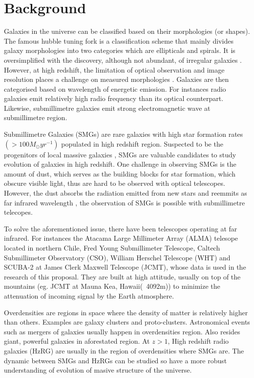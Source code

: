 \documentclass{article}
\begin{document}
\section{Background}
Galaxies in the universe can be classified based on their morphologies (or shapes). The famous hubble tuning fork is a classification scheme that mainly divides galaxy morphologies into two categories which are ellipticals and spirals. It is oversimplified with the discovery, although not abundant, of irregular galaxies \parencite{Gallagher1984}. However, at high redshift, the limitation of optical observation and image resolution places a challenge on measured morphologies \parencite{Rouan2008}. Galaxies are then categorised based on wavelength of energetic emission. For instances radio galaxies emit relatively high radio frequency than its optical counterpart. Likewise, submillimetre galaxies emit strong electromagnetic wave at submillimetre region.
\medskip

\noindent Submillimetre Galaxies (SMGs) are rare galaxies with high star formation rates $(>100M_\odot yr^{-1})$ \parencite{DaCunha2021} populated in high redshift region. Suspected to be the progenitors of local massive galaxies \parencite{Casey2014}, SMGs are valuable candidates to study evolution of galaxies in high redshift. One challenge in observing SMGs is the amount of dust, which serves as the building blocks for star formation, which obscure visible light, thus are hard to be observed with optical telescopes. However, the dust absorbs the radiation emitted from new stars and reemmits as far infrared wavelength \parencite{Casey2014}, the observation of SMGs is possible with submillimetre telecopes. 
\medskip

\noindent To solve the aforementioned issue, there have been telescopes operating at far infrared. For instances the Atacama Large Millimeter Array (ALMA) telesope located in northern Chile, Fred Young Submillimeter Telescope, Caltech Submillimeter Observatory (CSO), William Herschel Telescope (WHT)\parencite{Phillips2013} and SCUBA-2 at James Clerk Maxwell Telescope (JCMT), whose data is used in the research of this proposal. They are built at high attitude, usually on top of the mountains (eg. JCMT at Mauna Kea, Hawaii(~4092m)) to minimize the attenuation of incoming signal by the Earth atmosphere.\parencite{Phillips2013}
\medskip

\noindent Overdensities are regions in space where the density of matter is relatively higher than others. Examples are galaxy clusters and proto-clusters. Astronomical events such as mergers of galaxies usually happen in overdensities region. Also resides giant, powerful galaxies in aforestated region. At $z>1$, High redshift radio galaxies (HzRG) are usually in the region of overdensities where SMGs are. The dynamic between SMGs and HzRGs can be studied so have a more robust understanding of evolution of masive structure of the universe.\parencite{Saxena2018}
\end{document}
